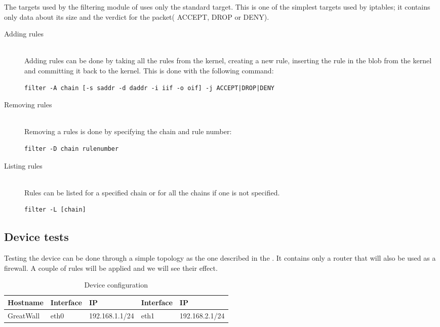 The targets used by the filtering module of \text{\project} uses only the standard target. This is one of the simplest targets
used by iptables; it contains only data about its size and the verdict for the packet( ACCEPT, DROP or DENY).

\begin{description}
\item[Adding rules] \hfill \\
Adding rules can be done by taking all the rules from the kernel, creating a 
new rule, inserting the rule in the blob from the kernel and committing it back
to the kernel. This is done with the following command:
\lstset{language=zsh,caption=Adding a rule,label=lst:saddrule}
\begin{lstlisting}
filter -A chain [-s saddr -d daddr -i iif -o oif] -j ACCEPT|DROP|DENY
\end{lstlisting}
\item[Removing rules] \hfill \\
Removing a rules is done by specifying the chain and rule number:
\lstset{language=zsh,caption=Deleting a rule,label=lst:sdelrule}
\begin{lstlisting}
filter -D chain rulenumber
\end{lstlisting}
\item[Listing rules] \hfill \\
Rules can be listed for a specified chain or for all the chains if one is not specified.
\lstset{language=zsh,caption=List rules,label=lst:slstrule}
\begin{lstlisting}
filter -L [chain]
\end{lstlisting}
\end{description}

\subsection{Device tests}
\label{sub-sec:firewall-tests}

Testing the device can be done through a simple topology as the one described in the . 
It contains only a router that will also be used as a firewall. A couple of rules will be applied 
and we will see their effect.


\begin{center}
  \begin{table}[htb]
  \begin{center}
  \begin{tabular}{| l | l | l | l | l |}
    \hline
      Hostname & Interface & IP & Interface & IP \\ \hline
      GreatWall & eth0 & 192.168.1.1/24 & eth1 & 192.168.2.1/24 \\ 
    \hline
  \end{tabular}
  \end{center}
  \caption{Device configuration}
  \label{table:tdevices}
  \end{table}
\end{center}

